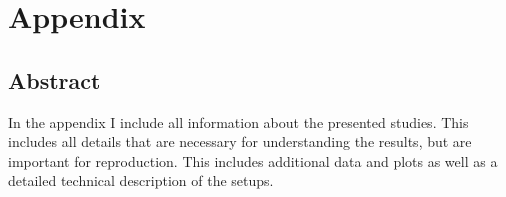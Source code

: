 \chapter{Appendix}

\section*{Abstract}
In the appendix I include all information about the presented studies.
This includes all details that are necessary for understanding the results, but are important for reproduction.
This includes additional data and plots as well as a detailed technical description of the setups.